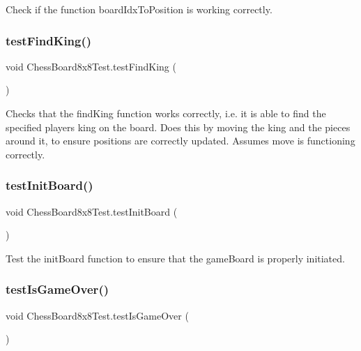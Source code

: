 Check if the function board\+Idx\+To\+Position is working correctly. \mbox{\label{class_chess_board8x8_test_a7f2da81ad7f3b8009164ddb09b5f0328}} 
\subsubsection{\texorpdfstring{test\+Find\+King()}{testFindKing()}}
{\footnotesize\ttfamily void Chess\+Board8x8\+Test.\+test\+Find\+King (\begin{DoxyParamCaption}{ }\end{DoxyParamCaption})}

Checks that the find\+King function works correctly, i.\+e. it is able to find the specified player\textquotesingle{}s king on the board. Does this by moving the king and the pieces around it, to ensure positions are correctly updated. Assumes \textquotesingle{}move\textquotesingle{} is functioning correctly. \mbox{\label{class_chess_board8x8_test_ad95f3f9c7e4c41d5f18016bea3a4f9a4}} 
\subsubsection{\texorpdfstring{test\+Init\+Board()}{testInitBoard()}}
{\footnotesize\ttfamily void Chess\+Board8x8\+Test.\+test\+Init\+Board (\begin{DoxyParamCaption}{ }\end{DoxyParamCaption})}

Test the init\+Board function to ensure that the game\+Board is properly initiated. \mbox{\label{class_chess_board8x8_test_aeb05e4785df2557766c7c651a4edd278}} 
\subsubsection{\texorpdfstring{test\+Is\+Game\+Over()}{testIsGameOver()}}
{\footnotesize\ttfamily void Chess\+Board8x8\+Test.\+test\+Is\+Game\+Over (\begin{DoxyParamCaption}{ }\end{DoxyParamCaption})}


